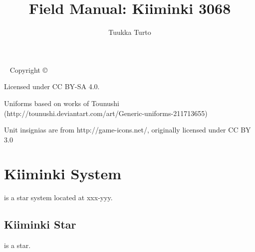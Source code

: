 \documentclass{tufte-book}
\title{Field Manual: Kiiminki 3068}
\author{Tuukka Turto}
\begin{document}
\frontmatter

\maketitle


\newpage
\begin{fullwidth}
~\vfill
\thispagestyle{empty}
\setlength{\parindent}{0pt}
\setlength{\parskip}{\baselineskip}
Copyright \copyright\ \the\year\ \thanklessauthor

\par Licensed under CC BY-SA 4.0.

\par Uniforms based on works of Tounushi (http://tounushi.deviantart.com/art/Generic-uniforms-211713655)

\par Unit insignias are from http://game-icons.net/, originally licensed under CC BY 3.0

\end{fullwidth}

\setcounter{tocdepth}{1}
\tableofcontents
\listoffigures
\listoftables

\mainmatter


\chapter{Kiiminki System}
\label{ch:kiiminki-system}

 is a star system located at xxx-yyy.

\section{Kiiminki Star}

 is a star.
\end{document}

